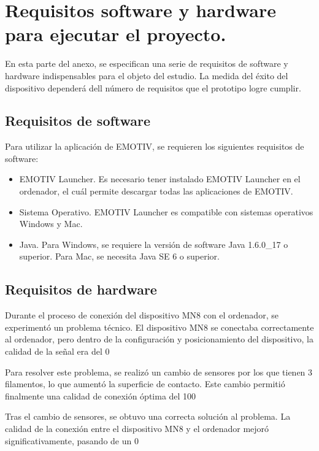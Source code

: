 
\section{Requisitos software y hardware para ejecutar el proyecto.}
En esta parte del anexo, se especifican una serie de requisitos de software y hardware indispensables para el objeto del estudio. La medida del éxito del dispositivo dependerá dell número de requisitos que el prototipo logre cumplir.

\subsection{Requisitos de software}
Para utilizar la aplicación de EMOTIV, se requieren los siguientes requisitos de software:

\begin{itemize}
    \item EMOTIV Launcher. Es necesario tener instalado EMOTIV Launcher en el ordenador, el cuál permite descargar todas las aplicaciones de EMOTIV.
    \item Sistema Operativo. EMOTIV Launcher es compatible con sistemas operativos Windows y Mac.
    \item Java. Para Windows, se requiere la versión de software Java 1.6.0_17 o superior. Para Mac, se necesita Java SE 6 o superior.
 \end{itemize}   

\subsection{Requisitos de hardware}
Durante el proceso de conexión del dispositivo MN8 con el ordenador, se experimentó un problema técnico. El dispositivo MN8 se conectaba correctamente al ordenador, pero dentro de la configuración y posicionamiento del dispositivo, la calidad de la señal era del 0%

Para resolver este problema, se realizó un cambio de sensores por los que tienen 3 filamentos, lo que aumentó la superficie de contacto. Este cambio permitió finalmente una calidad de conexión óptima del 100%

Tras el cambio de sensores, se obtuvo una correcta solución al problema. La calidad de la conexión entre el dispositivo MN8 y el ordenador mejoró significativamente, pasando de un 0%


